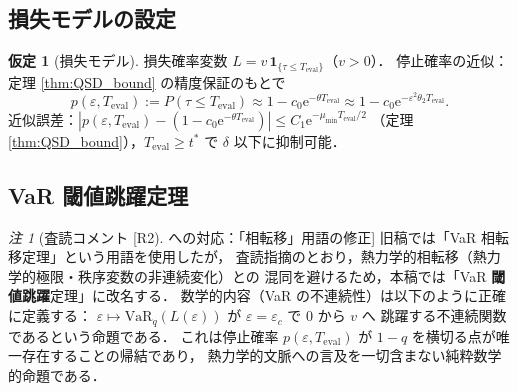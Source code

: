 \documentclass[12pt,a4paper]{article}
\theoremstyle{plain}
\theoremstyle{definition}
\newtheorem{assumption}[theorem]{仮定}
\theoremstyle{remark}
\newtheorem{remark}[theorem]{注}
\newcommand{\eps}{\varepsilon}
\newcommand{\e}{\mathrm{e}}
\newcommand{\VaR}{\mathrm{VaR}}
\newcommand{\Teval}{T_{\mathrm{eval}}}
\begin{document}
\subsection{損失モデルの設定}

\begin{assumption}[損失モデル]\label{ass:loss}
  損失確率変数 $L = v\,\mathbf{1}_{\{\tau\le\Teval\}}$（$v>0$）．
  停止確率の近似：定理 \ref{thm:QSD_bound} の精度保証のもとで
  \begin{equation}\label{eq:stop_prob}
    p(\eps,\Teval)
    := P(\tau\le\Teval)
    \approx 1-c_0\e^{-\theta\Teval}
    \approx 1-c_0\e^{-\eps^2\theta_2\Teval}.
  \end{equation}
  近似誤差：$|p(\eps,\Teval)-(1-c_0\e^{-\theta\Teval})|\le C_1\e^{-\mu_{\min}\Teval/2}$
  （定理 \ref{thm:QSD_bound}），$\Teval\ge t^*$ で $\delta$ 以下に抑制可能．
\end{assumption}

\subsection{VaR 閾値跳躍定理}

\begin{remark}[査読コメント [R2] への対応：「相転移」用語の修正]
  旧稿では「VaR 相転移定理」という用語を使用したが，
  査読指摘のとおり，熱力学的相転移（熱力学的極限・秩序変数の非連続変化）との
  混同を避けるため，本稿では「VaR \textbf{閾値跳躍}定理」に改名する．
  数学的内容（VaR の不連続性）は以下のように正確に定義する：
  $\eps\mapsto\VaR_q(L(\eps))$ が $\eps=\eps_c$ で $0$ から $v$ へ
  跳躍する不連続関数であるという命題である．
  これは停止確率 $p(\eps,\Teval)$ が $1-q$ を横切る点が唯一存在することの帰結であり，
  熱力学的文脈への言及を一切含まない純粋数学的命題である．
\end{remark}
\end{document}
